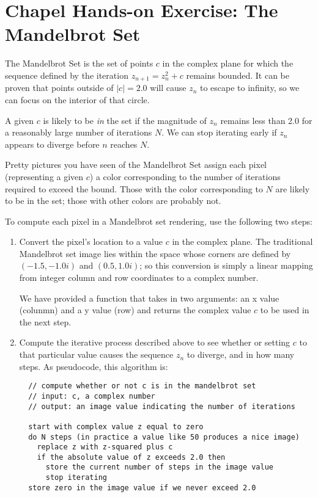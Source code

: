 \documentclass[10pt]{article}
\begin{document}
\lstset{language=chapel}

\section*{Chapel Hands-on Exercise: The Mandelbrot Set}

\noindent The Mandelbrot Set is the set of points $c$ in the complex
plane for which the sequence defined by the iteration
$z_{n+1} = z_n^2 + c$ remains bounded.  It can be
proven that points outside of $|c| = 2.0$ will cause $z_n$ to escape
to infinity, so we can focus on the interior of that circle.

\vspace{5pt}
\noindent A given $c$ is likely to be \emph{in} the set if the
magnitude of $z_n$ remains less than 2.0 for a reasonably large number
of iterations $N$.  We can stop iterating early if $z_n$ appears to
diverge before $n$ reaches $N$.

\vspace{5pt}
\noindent Pretty pictures you have seen of the Mandelbrot Set assign
each pixel (representing a given $c$) a color corresponding to the
number of iterations required to exceed the bound.  Those with the
color corresponding to $N$ are likely to be in the set; those with
other colors are probably not.

\vspace{10pt}

\noindent
To compute each pixel in a Mandelbrot set rendering, use the
following two steps:
\begin{enumerate}

\item Convert the pixel's location to a value $c$ in the complex
  plane.  The traditional Mandelbrot set image lies within the space
  whose corners are defined by $(-1.5, -1.0i)$ and $(0.5, 1.0i)$; so
  this conversion is simply a linear mapping from integer column
  and row coordinates to a complex number.

  We have provided a function  that takes
  in two arguments: an x value (colunmn) and a y value (row)
  and returns the complex value $c$ to be used in the next step.

\item Compute the iterative process described above to see whether or
  setting $c$ to that particular value causes the sequence $z_n$ to
  diverge, and in how many steps.  As pseudocode, this
  algorithm is:

\begin{verbatim}
  // compute whether or not c is in the mandelbrot set
  // input: c, a complex number
  // output: an image value indicating the number of iterations

  start with complex value z equal to zero
  do N steps (in practice a value like 50 produces a nice image)
    replace z with z-squared plus c
    if the absolute value of z exceeds 2.0 then
      store the current number of steps in the image value
      stop iterating
  store zero in the image value if we never exceed 2.0
\end{verbatim}
\end{enumerate}
\end{document}
